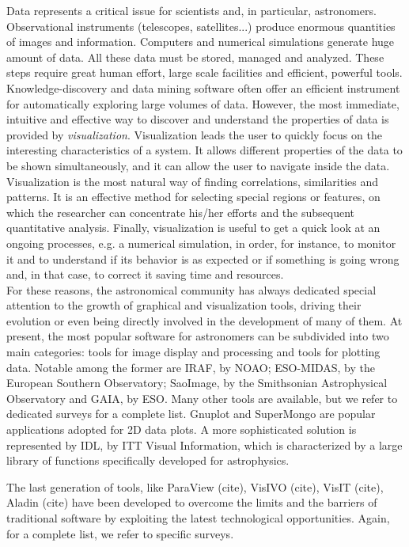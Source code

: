 Data represents a critical issue for scientists and, in particular, astronomers. 
Observational instruments (telescopes, satellites...) produce enormous quantities of images and information. 
Computers and numerical simulations generate huge amount of data. All these data must be stored, 
managed and analyzed. These steps require great human effort, large scale facilities and efficient, powerful tools.  
Knowledge-discovery and data mining software often offer an efficient
instrument for automatically exploring large volumes of data. However, the most immediate,
intuitive and effective way to discover and understand the properties of data
is provided by {\it visualization}. Visualization leads the user to quickly
focus on the interesting characteristics of a system. It allows
 different properties of the data to be shown simultaneously, and it can allow the user 
to navigate inside the data. Visualization is the most natural way of finding correlations, 
similarities and patterns. It is an effective method for
selecting special regions or features, on which the researcher can concentrate his/her
efforts and the subsequent quantitative analysis. Finally, visualization is 
useful to get a quick look at an ongoing processes, e.g. a numerical simulation, 
in order, for instance, to monitor it and to understand if its behavior is as expected or if
something is going wrong and, in that case, to correct it saving time and resources.\\
For these reasons, the astronomical community has always dedicated special
attention to the growth of graphical and visualization tools, driving their evolution or even being
directly involved in the development of many of them.
At present, the most popular software for astronomers can be subdivided
into two main categories: tools for image display and processing and tools for
plotting data. Notable among the former are IRAF, by NOAO; ESO-MIDAS, by the 
European Southern Observatory; SaoImage, by the Smithsonian Astrophysical Observatory and
GAIA, by ESO. Many other tools are available, but we refer to dedicated surveys
for a complete list. Gnuplot and SuperMongo are 
popular applications adopted for 2D data plots. A more sophisticated solution 
is represented by IDL, by ITT Visual Information, which is characterized
by a large library of functions specifically developed for astrophysics. 

The last generation 
of tools, like ParaView (cite), VisIVO (cite), VisIT (cite), Aladin
(cite) have been developed to overcome the limits
and the barriers of traditional software by exploiting the latest technological 
opportunities. Again, for a complete list, we refer to specific surveys. 

